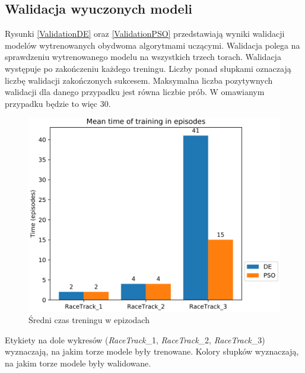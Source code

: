 \subsection{Walidacja wyuczonych modeli}
Rysunki \ref{ValidationDE} oraz \ref{ValidationPSO} przedstawiają wyniki walidacji modelów wytrenowanych obydwoma algorytmami uczącymi. Walidacja polega na sprawdzeniu wytrenowanego modelu na wszystkich trzech torach. Walidacja występuje po zakończeniu każdego treningu. Liczby ponad słupkami oznaczają liczbę walidacji zakończonych sukcesem. Maksymalna liczba pozytywnych walidacji dla danego przypadku jest równa liczbie prób. W omawianym przypadku będzie to więc 30.
\begin{figure}[H]
\centering
\includegraphics[width=15cm]{resources/figures/train_time_episodes.png}
\caption{Średni czas treningu w epizodach}
\label{MeanTimeEpisodes}
\end{figure}

Etykiety na dole wykresów (\textit{RaceTrack}\_1, \textit{RaceTrack}\_2, \textit{RaceTrack}\_3) wyznaczają, na jakim torze modele były trenowane. Kolory słupków wyznaczają, na jakim torze modele były walidowane.

